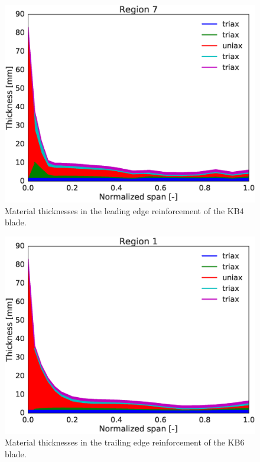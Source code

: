 \begin{figure}[!ht]
\begin{center}
	\includegraphics[width=.85\linewidth]{figures/KB4_laminate_layers_r07.eps}
\end{center}
\caption{Material thicknesses in the leading edge reinforcement of the KB4 blade.}
\label{fig:KB4matstackr07}
\end{figure}


\begin{figure}[!ht]
\begin{center}
	\includegraphics[width=.85\linewidth]{figures/KB6_laminate_layers_r01.eps}
\end{center}
\caption{Material thicknesses in the trailing edge reinforcement of the KB6 blade.}
\label{fig:KB6matstackr01}
\end{figure}

